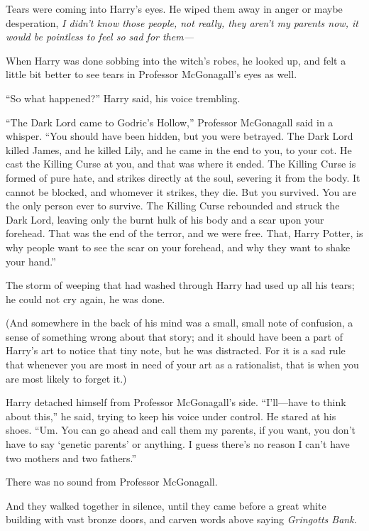 Tears were coming into Harry’s eyes. He wiped them away in anger or maybe desperation, \emph{I didn’t know those people, not really, they aren’t my parents \emph{now,} it would be pointless to feel so sad for them—}

When Harry was done sobbing into the witch’s robes, he looked up, and felt a little bit better to see tears in Professor McGonagall’s eyes as well.

“So what happened?” Harry said, his voice trembling.

“The Dark Lord came to Godric’s Hollow,” Professor McGonagall said in a whisper. “You should have been hidden, but you were betrayed. The Dark Lord killed James, and he killed Lily, and he came in the end to you, to your cot. He cast the Killing Curse at you, and that was where it ended. The Killing Curse is formed of pure hate, and strikes directly at the soul, severing it from the body. It cannot be blocked, and whomever it strikes, they die. But you survived. You are the only person ever to survive. The Killing Curse rebounded and struck the Dark Lord, leaving only the burnt hulk of his body and a scar upon your forehead. That was the end of the terror, and we were free. That, Harry Potter, is why people want to see the scar on your forehead, and why they want to shake your hand.”

The storm of weeping that had washed through Harry had used up all his tears; he could not cry again, he was done.

(And somewhere in the back of his mind was a small, small note of confusion, a sense of something wrong about that story; and it should have been a part of Harry’s art to notice that tiny note, but he was distracted. For it is a sad rule that whenever you are most in need of your art as a rationalist, that is when you are most likely to forget it.)

Harry detached himself from Professor McGonagall’s side. “I’ll—have to think about this,” he said, trying to keep his voice under control. He stared at his shoes. “Um. You can go ahead and call them my parents, if you want, you don’t have to say ‘genetic parents’ or anything. I guess there’s no reason I can’t have two mothers and two fathers.”

There was no sound from Professor McGonagall.

And they walked together in silence, until they came before a great white building with vast bronze doors, and carven words above saying \emph{Gringotts Bank.}

